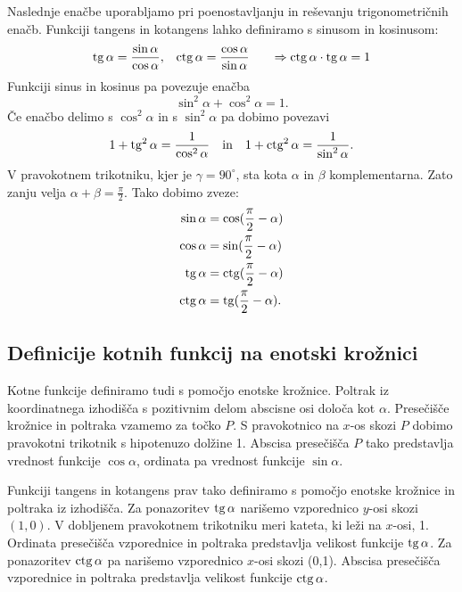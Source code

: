 Naslednje enačbe uporabljamo pri poenostavljanju in reševanju trigonometričnih enačb. Funkciji tangens in kotangens lahko definiramo s sinusom in kosinusom:
\begin{align*}
\operatorname{tg} \alpha &= \frac{\sin \alpha}{\cos \alpha}, &
\operatorname{ctg} \alpha &= \frac{\cos \alpha}{\sin \alpha} \quad &
\Rightarrow \operatorname{ctg} \alpha \cdot \operatorname{tg} \alpha = 1
\end{align*}
Funkciji sinus in kosinus pa povezuje enačba
\begin{equation*}
\sin^2 \alpha + \cos^2 \alpha = 1.
\end{equation*}
Če enačbo delimo s $\cos^2\alpha$ in s $\sin^2\alpha$  pa dobimo povezavi
\begin{equation*}
1+ \operatorname{tg}^2 \alpha = \frac{1}{\cos^2\alpha}\quad \text{in} \quad
1+ \operatorname{ctg}^2 \alpha= \frac{1}{\sin^2\alpha}.
\end{equation*}
V pravokotnem trikotniku, kjer je $\gamma={90}^{\circ}$, sta kota $\alpha$ in $\beta$ komplementarna. Zato zanju velja $\alpha+\beta= \frac{\pi}{2}$. Tako dobimo zveze:
\begin{align*}
\sin\alpha &= \cos(\frac{\pi}{2}- \alpha) \\
\cos\alpha &= \sin(\frac{\pi}{2}- \alpha) \\
\operatorname{tg} \alpha &= \operatorname{ctg}(\frac{\pi}{2}- \alpha) \\
\operatorname{ctg}\alpha &= \operatorname{tg}(\frac{\pi}{2}- \alpha).
\end{align*}

\subsection{Definicije kotnih funkcij na enotski krožnici}

Kotne funkcije definiramo tudi s pomočjo enotske krožnice. Poltrak iz koordinatnega izhodišča s pozitivnim delom abscisne osi določa kot $\alpha$. Presečišče krožnice in poltraka vzamemo za točko $P$. S pravokotnico na $x$-os skozi $P$ dobimo pravokotni trikotnik s hipotenuzo dolžine 1. Abscisa presečišča $P$ tako predstavlja vrednost funkcije $\cos\alpha$, ordinata pa vrednost funkcije $\sin\alpha$. 

Funkciji tangens in kotangens prav tako definiramo s pomočjo enotske krožnice in poltraka iz izhodišča. Za ponazoritev $\operatorname{tg}\alpha$ narišemo vzporednico $y$-osi skozi $(1,0)$. V dobljenem pravokotnem trikotniku meri kateta, ki leži na $x$-osi, 1. Ordinata presečišča vzporednice in poltraka predstavlja velikost funkcije $\operatorname{tg}\alpha$. Za ponazoritev $\operatorname{ctg}\alpha$ pa narišemo vzporednico $x$-osi skozi (0,1). Abscisa presečišča vzporednice in poltraka predstavlja velikost funkcije $\operatorname{ctg}\alpha$. 

